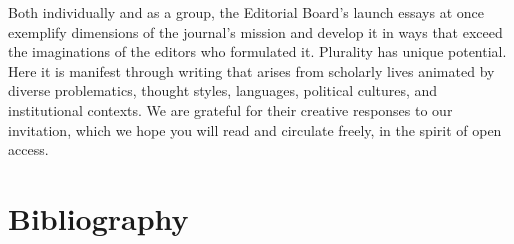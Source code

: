 \documentclass{tufte-handout}
\begin{document}
Both individually and as a group, the Editorial Board's launch essays at
once exemplify dimensions of the journal's mission and develop it in
ways that exceed the imaginations of the editors who formulated it.
Plurality has unique potential. Here it is manifest through writing that
arises from scholarly lives animated by diverse problematics, thought
styles, languages, political cultures, and institutional contexts. We
are grateful for their creative responses to our invitation, which we
hope you will read and circulate freely, in the spirit of open access.





\section{Bibliography}\label{bibliography}
\end{document}
